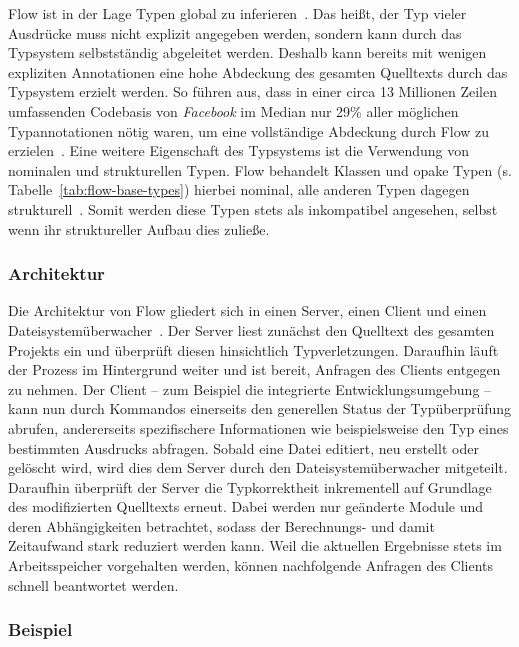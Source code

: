 Flow ist in der Lage Typen global zu inferieren~\autocite[25]{FLOW:PAPER}. Das heißt, der Typ vieler Ausdrücke muss nicht explizit angegeben werden, sondern kann durch das Typsystem selbstständig abgeleitet werden. Deshalb kann bereits mit wenigen expliziten Annotationen eine hohe Abdeckung des gesamten Quelltexts durch das Typsystem erzielt werden. So führen \citeauthor{FLOW:PAPER} aus, dass in einer circa 13 Millionen Zeilen umfassenden Codebasis von \textit{Facebook} im Median nur 29\% aller möglichen Typannotationen nötig waren, um eine vollständige Abdeckung durch Flow zu erzielen~\autocite[24]{FLOW:PAPER}. Eine weitere Eigenschaft des Typsystems ist die Verwendung von nominalen und strukturellen Typen. Flow behandelt Klassen und opake Typen (s. Tabelle~\ref{tab:flow-base-types}) hierbei nominal, alle anderen Typen dagegen strukturell~\autocite{FLOW:NOMINAL_TYPES}. Somit werden diese Typen stets als inkompatibel angesehen, selbst wenn ihr struktureller Aufbau dies zuließe.

\subsubsection{Architektur}

Die Architektur von Flow gliedert sich in einen Server, einen Client und einen Dateisystemüberwacher~\autocite[22]{FLOW:PAPER}. Der Server liest zunächst den Quelltext des gesamten Projekts ein und überprüft diesen hinsichtlich Typverletzungen. Daraufhin läuft der Prozess im Hintergrund weiter und ist bereit, Anfragen des Clients entgegen zu nehmen. Der Client -- zum Beispiel die integrierte Entwicklungsumgebung -- kann nun durch Kommandos einerseits den generellen Status der Typüberprüfung abrufen, andererseits spezifischere Informationen wie beispielsweise den Typ eines bestimmten Ausdrucks abfragen. Sobald eine Datei editiert, neu erstellt oder gelöscht wird, wird dies dem Server durch den Dateisystemüberwacher mitgeteilt. Daraufhin überprüft der Server die Typkorrektheit inkrementell auf Grundlage des modifizierten Quelltexts erneut. Dabei werden nur geänderte Module und deren Abhängigkeiten betrachtet, sodass der Berechnungs- und damit Zeitaufwand stark reduziert werden kann. Weil die aktuellen Ergebnisse stets im Arbeitsspeicher vorgehalten werden, können nachfolgende Anfragen des Clients schnell beantwortet werden.

\subsubsection{Beispiel}

